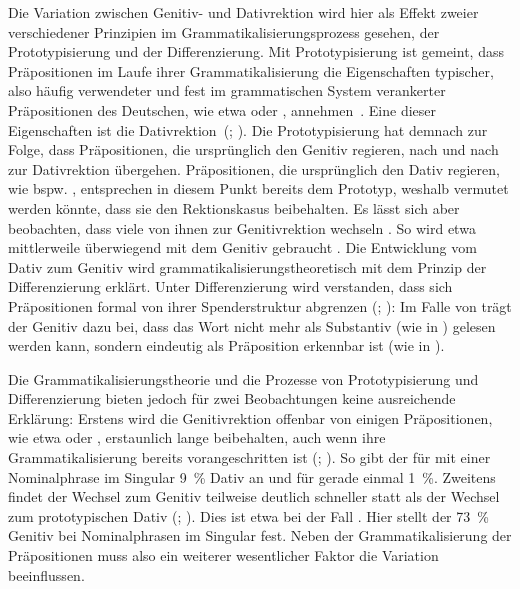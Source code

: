 Die Variation zwischen Genitiv- und Dativrektion wird hier als Effekt zweier verschiedener Prinzipien im Grammatikalisierungsprozess gesehen, der Prototypisierung und der Differenzierung. 
Mit Prototypisierung ist gemeint, dass Präpositionen im Laufe ihrer Grammatikalisierung die Eigenschaften typischer, also häufig verwendeter und fest im grammatischen System verankerter Präpositionen des Deutschen, wie etwa  oder ,  annehmen~\citep[s.][17]{Lindqvist1994}. 
Eine dieser Eigenschaften ist die Dativrektion~(\citealp[s.][15--16]{Lindqvist1994}; \citealp[94]{Szczepaniak2011}). 
Die Prototypisierung hat demnach zur Folge, dass Präpositionen, die ursprünglich den Genitiv regieren, nach und nach zur Dativrektion übergehen.
Präpositionen, die ursprünglich den Dativ regieren, wie bspw. \dank{}, entsprechen in diesem Punkt bereits dem Prototyp, weshalb vermutet werden könnte, dass sie den Rektionskasus beibehalten.
Es lässt sich aber beobachten, dass viele von ihnen zur Genitivrektion wechseln \citep[s.][256]{DiMeola2005b}. 
So wird etwa \dank{} mittlerweile überwiegend mit dem Genitiv gebraucht \citep[s.][§915]{Duden2016}. 
Die Entwicklung vom Dativ zum Genitiv wird grammatikalisierungstheoretisch mit dem Prinzip der Differenzierung erklärt. 
Unter Differenzierung wird verstanden, dass sich Präpositionen formal von ihrer Spenderstruktur abgrenzen (\citealp[s.][144]{DiMeola2000}; \citealp[422]{DiMeola2006}): 
Im Falle von \dank{} trägt der Genitiv dazu bei, dass das Wort nicht mehr als Substantiv (wie in ) gelesen werden kann, sondern eindeutig als Präposition erkennbar ist (wie in ).

Die Grammatikalisierungstheorie und die Prozesse von Prototypisierung und Differenzierung bieten jedoch für zwei Beobachtungen keine ausreichende Erklärung: 
Erstens wird die Genitivrektion offenbar von einigen Präpositionen, wie etwa \wegen{} oder \waehrend{}, erstaunlich lange beibehalten, auch wenn ihre Grammatikalisierung bereits vorangeschritten ist (\citealp[s.][218--219]{DiMeola2003}; \citealp[][214]{Vieregge.2019}).
So gibt der \citet[§915]{Duden2016} für \waehrend{} mit einer Nominalphrase im Singular 9~\% Dativ an und für \wegen{} gerade einmal 1~\%. 
Zweitens findet der Wechsel zum Genitiv teilweise deutlich schneller statt als der Wechsel zum prototypischen Dativ (\citealp[s.][216]{DiMeola2000}; \citealp[][214]{Vieregge.2019}). 
Dies ist etwa bei \dank{} der Fall \citep[s.][257]{Baumann2014}. 
Hier stellt der \citet[§915]{Duden2016} 73~\% Genitiv bei Nominalphrasen im Singular fest. 
Neben der Grammatikalisierung der Präpositionen muss also ein weiterer wesentlicher Faktor die Variation beeinflussen. 

